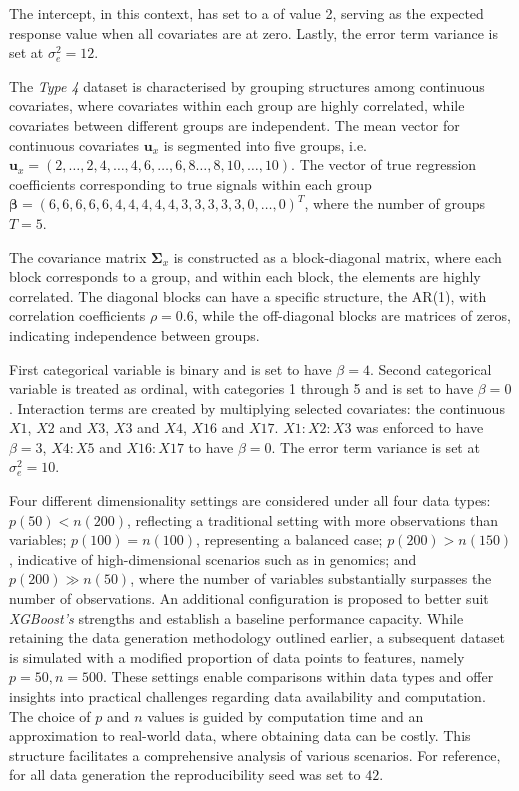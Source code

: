 \documentclass[
  11pt,
]{article}
\begin{document}
The intercept, in this context, has set to a of value 2, serving as the
expected response value when all covariates are at zero. Lastly, the
error term variance is set at \(\sigma_e^2 = 12\).

\hfill\break
\hfill\break

The \emph{Type 4} dataset is characterised by grouping structures among
continuous covariates, where covariates within each group are highly
correlated, while covariates between different groups are independent.
The mean vector for continuous covariates \(\mathbf{u}_x\) is segmented
into five groups,
i.e.~\(\mathbf{u}_x = (2, \ldots, 2, 4, \ldots, 4, 6, \ldots, 6, 8 \ldots, 8, 10, \ldots, 10)\).
The vector of true regression coefficients corresponding to true signals
within each group
\(\boldsymbol{\beta} = (6, 6, 6, 6, 6, 4, 4, 4, 4, 4, 3, 3, 3, 3, 3, 0, \ldots, 0)^T\),
where the number of groups \(T = 5\).

The covariance matrix \(\mathbf{\Sigma}_x\) is constructed as a
block-diagonal matrix, where each block corresponds to a group, and
within each block, the elements are highly correlated. The diagonal
blocks can have a specific structure, the AR(1), with correlation
coefficients \(\rho = 0.6\), while the off-diagonal blocks are matrices
of zeros, indicating independence between groups.

First categorical variable is binary and is set to have \(\beta = 4\).
Second categorical variable is treated as ordinal, with categories 1
through 5 and is set to have \(\beta = 0\). Interaction terms are
created by multiplying selected covariates: the continuous \(X1\),
\(X2\) and \(X3\), \(X3\) and \(X4\), \(X16\) and \(X17\). \(X1:X2:X3\)
was enforced to have \(\beta = 3\), \(X4 : X5\) and \(X16 : X17\) to
have \(\beta = 0\). The error term variance is set at
\(\sigma_e^2 = 10\).

Four different dimensionality settings are considered under all four
data types: \(p(50) < n(200)\), reflecting a traditional setting with
more observations than variables; \(p(100) = n(100)\), representing a
balanced case; \(p(200) > n(150)\), indicative of high-dimensional
scenarios such as in genomics; and \(p(200) \gg n(50)\), where the
number of variables substantially surpasses the number of observations.
An additional configuration is proposed to better suit \emph{XGBoost's}
strengths and establish a baseline performance capacity. While retaining
the data generation methodology outlined earlier, a subsequent dataset
is simulated with a modified proportion of data points to features,
namely \(p=50, n=500\). These settings enable comparisons within data
types and offer insights into practical challenges regarding data
availability and computation. The choice of \(p\) and \(n\) values is
guided by computation time and an approximation to real-world data,
where obtaining data can be costly. This structure facilitates a
comprehensive analysis of various scenarios. For reference, for all data
generation the reproducibility seed was set to \(42\).
\end{document}
